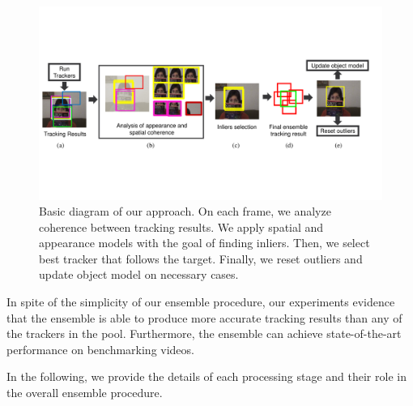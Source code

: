 \begin{figure}[t!]
\centering
\includegraphics[width=1\linewidth, trim= 0cm 5.1cm 1.3cm 5.3cm, clip=true]{Figures/diagram}
\caption{\small Basic diagram of our approach. On each frame, we analyze coherence
        between tracking results. We apply spatial and appearance models with
        the goal of finding inliers. Then, we select best tracker that follows
        the target. Finally, we reset outliers and  update object model on
        necessary cases.
}
\label{fig::diagram}
\end{figure}


In spite of the simplicity of our ensemble procedure, our experiments
evidence that the ensemble is able to produce more accurate tracking results
than any of the trackers in the pool. Furthermore, the ensemble can
achieve state-of-the-art performance on benchmarking videos.

In the following, we provide the details of each processing stage and their
role in the overall ensemble procedure.


